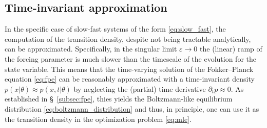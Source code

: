 \subsection{Time-invariant approximation}\label{subsec:approximation_oup}
In the specific case of slow-fast systems of the form \eqref{eq:slow_fast}, the computation of the transition density, despite not being tractable analytically, can be approximated.
Specifically, in the singular limit $\varepsilon\to0$ the (linear) ramp of the forcing parameter is much slower than the timescale of the evolution for the state variable. 
This means that the time-varying solution of the Fokker--Planck equation \eqref{eq:fpe} can be reasonably approximated with a time-invariant density $p(x|\theta)\approx p(x,t|\theta)$ by neglecting the (partial) time derivative $\partial_{t}p\approx0$.
As established in \S~\ref{subsec:fpe}, thies yields the Boltzmann-like equilibrium distribution \eqref{eq:boltzmann_distribution} and thus, in principle, one can use it as the transition density in the optimization problem \eqref{eq:mle}.

